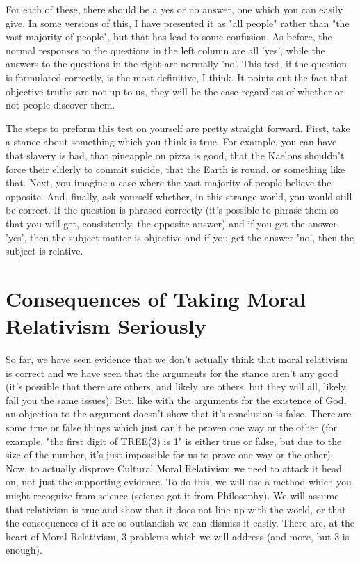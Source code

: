 For each of these, there should be a yes or no answer, one which you can easily give. In some versions of this, I have presented it as "all people" rather than "the vast majority of people", but that has lead to some confusion. As before, the normal responses to the questions in the left column are all 'yes', while the answers to the questions in the right are normally 'no'. This test, if the question is formulated correctly, is the most definitive, I think. It points out the fact that objective truths are not up-to-us, they will be the case regardless of whether or not people discover them. 

The steps to preform this test on yourself are pretty straight forward. First, take a stance about something which you think is true. For example, you can have that slavery is bad, that pineapple on pizza is good, that the Kaelons shouldn't force their elderly to commit suicide, that the Earth is round, or something like that. Next, you imagine a case where the vast majority of people believe the opposite. And, finally, ask yourself whether, in this strange world, you would still be correct.  If the question is phrased correctly (it's possible to phrase them so that you will get, consistently, the opposite answer) and if you get the answer 'yes', then the subject matter is objective and if you get the answer 'no', then the subject is relative.

\section{Consequences of Taking Moral Relativism Seriously}

So far, we have seen evidence that we don't actually think that moral relativism is correct and we have seen that the arguments for the stance aren't any good (it's possible that there are others, and likely are others, but they will all, likely, fall you the same issues). But, like with the arguments for the existence of God, an objection to the argument doesn't show that it's conclusion is false. There are some true or false things which just can't be proven one way or the other (for example, "the first digit of TREE(3) is 1" is either true or  false, but due to the size of the number, it's just impossible for us to prove one way or the other). Now, to actually disprove Cultural Moral Relativism we need to attack it head on, not just the supporting evidence. To do this, we will use a method which you might recognize from science (science got it from Philosophy). We will assume that relativism is true and show that it does not line up with the world, or that the consequences of it are so outlandish we can dismiss it easily. There are, at the heart of Moral Relativism, 3 problems which we will address (and more, but 3 is enough). 

